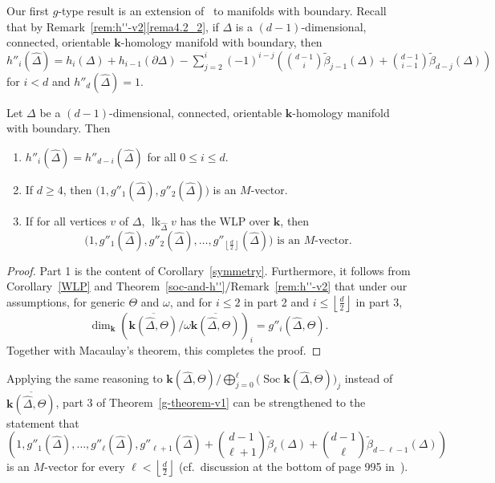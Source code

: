 \documentclass[ALCO,ThmDefs,Unicode,epreuves]{cedram}
\DeclareMathOperator\lk{lk}
\DeclareMathOperator{\Soc}{Soc}
\newcommand{\complet}[1]{\hat{#1}}
\newcommand{\field}{\mathbf{k}}
\newcommand{\halffloor}{\left\lfloor \frac{d}{2}\right\rfloor}
\begin{document}
Our first $g$-type result is an extension of~\cite[Theorem~3.2]{Novik-Swartz-09:Gorenstein} to manifolds with boundary. Recall that by Remark~\ref{rem:h''-v2}\eqref{rema4.2_2}, if $\Delta$ is a $(d-1)$-dimensional, connected, orientable $\field$-homology manifold with boundary, then $h''_i(\complet{\Delta})=h_i(\Delta)+h_{i-1}(\partial\Delta)-\sum_{j=2}^{i}(-1)^{i-j}\left(\binom{d-1}{i}\tilde{\beta}_{j-1}(\Delta)+\binom{d-1}{i-1}\tilde{\beta}_{d-j}(\Delta)\right)$ for $i<d$ and $h''_d(\complet{\Delta})=1$. 
\begin{theorem} \label{g-theorem-v1}
Let $\Delta$ be a $(d-1)$-dimensional, connected, orientable $\field$-homology manifold with boundary. Then
\begin{enumerate}
\item\label{theo5.1_1} $h''_i(\complet{\Delta})=h''_{d-i}(\complet{\Delta})$ for all $0\leq i \leq d$. 
\item\label{theo5.1_2} If $d\geq 4$, then $\big(1, g''_1(\complet{\Delta}), g''_2(\complet{\Delta})\big)$ is an $M$-vector.
\item\label{theo5.1_3} If for all vertices $v$ of $\Delta$, $\lk_{\complet{\Delta}}v$ has the WLP over $\field$, then 
\[
\big(1, g''_1(\complet{\Delta}), g''_2(\complet{\Delta}), \ldots, g''_{\halffloor}(\complet{\Delta})\big)
\text{ is an $M$-vector.}
\] 
\end{enumerate}
\end{theorem}
\begin{proof}
Part 1 is the content of Corollary~\ref{symmetry}. Furthermore, it follows from Corollary~\ref{WLP} and Theorem~\ref{soc-and-h''}/Remark~\ref{rem:h''-v2} that under our assumptions, for generic $\Theta$ and $\omega$, and for $i\leq 2$ in part 2 and $i\leq \halffloor$ in part 3, 
\[
\dim_\field \left(\overline{\field(\complet{\Delta},\Theta)}/\omega \overline{\field(\complet{\Delta},\Theta)}\right)_i=g''_i(\complet{\Delta},\Theta).
\]
Together with Macaulay's theorem, this completes the proof.
\end{proof}

\begin{rema} Applying the same reasoning to $\field(\complet{\Delta},\Theta)/\bigoplus_{j=0}^{\ell} \big(\Soc \field(\complet{\Delta},\Theta)\big)_j$ instead of $\overline{\field(\complet{\Delta},\Theta)}$, part 3 of Theorem~\ref{g-theorem-v1} can be strengthened to the statement that 
\[
\left(1, g''_1(\complet{\Delta}), \ldots, g''_\ell(\complet{\Delta}), g''_{\ell+1}(\complet{\Delta})+\binom{d-1}{\ell+1}\tilde{\beta}_\ell(\Delta)+\binom{d-1}{\ell}\tilde{\beta}_{d-\ell-1}(\Delta)\right)
\] 
is an $M$-vector for every $\ell<\halffloor$ (cf.~discussion at the bottom of page 995 in~\cite{Novik-Swartz-09:Gorenstein}).
\end{rema}
\end{document}
